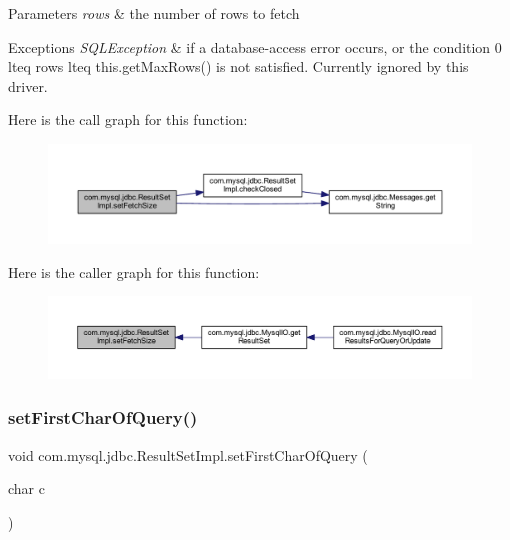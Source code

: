\begin{DoxyParams}{Parameters}
{\em rows} & the number of rows to fetch\\
\hline
\end{DoxyParams}

\begin{DoxyExceptions}{Exceptions}
{\em S\+Q\+L\+Exception} & if a database-\/access error occurs, or the condition 0 lteq rows lteq this.\+get\+Max\+Rows() is not satisfied. Currently ignored by this driver. \\
\hline
\end{DoxyExceptions}
Here is the call graph for this function\+:
\nopagebreak
\begin{figure}[H]
\begin{center}
\leavevmode
\includegraphics[width=350pt]{classcom_1_1mysql_1_1jdbc_1_1_result_set_impl_a3d7a3b48520675c00358f995af291fbe_cgraph}
\end{center}
\end{figure}
Here is the caller graph for this function\+:
\nopagebreak
\begin{figure}[H]
\begin{center}
\leavevmode
\includegraphics[width=350pt]{classcom_1_1mysql_1_1jdbc_1_1_result_set_impl_a3d7a3b48520675c00358f995af291fbe_icgraph}
\end{center}
\end{figure}
\mbox{\label{classcom_1_1mysql_1_1jdbc_1_1_result_set_impl_af4fe74c27ee2030bc12bc629f57f944f}} 
\subsubsection{\texorpdfstring{set\+First\+Char\+Of\+Query()}{setFirstCharOfQuery()}}
{\footnotesize\ttfamily void com.\+mysql.\+jdbc.\+Result\+Set\+Impl.\+set\+First\+Char\+Of\+Query (\begin{DoxyParamCaption}\item[{char}]{c }\end{DoxyParamCaption})}

